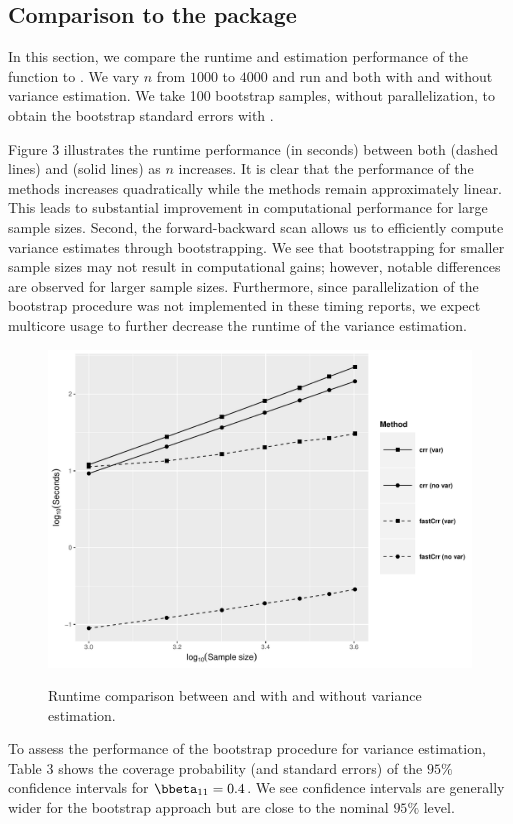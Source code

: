 \subsection[Comparison to the crr package]{Comparison to the  package}
\label{s3:crr}
In this section, we compare the runtime and estimation performance of the  function to . We vary $n$ from $1000$ to $4000$ and run  and  both with and without variance estimation. We take 100 bootstrap samples, {\color{blue}without parallelization}, to obtain the bootstrap standard errors with . 

Figure 3 illustrates the runtime performance (in seconds) between both  (dashed lines) and  (solid lines) as $n$ increases. It is clear that the performance of the  methods increases quadratically while the  methods remain approximately linear. This leads to substantial improvement in computational performance for large sample sizes. Second, the forward-backward scan allows us to efficiently compute variance estimates through bootstrapping. We see that bootstrapping for smaller sample sizes may not result in computational gains; however, notable differences are observed for larger sample sizes. {\color{blue} Furthermore, since parallelization of the bootstrap procedure was not implemented in these timing reports, we expect multicore usage to further decrease the runtime of the variance estimation}. 

\begin{figure}[t!]
\centering
\includegraphics[scale = 0.6]{plots/log_NOPEN-eps-converted-to.pdf}
\label{fig3:timing}
\caption{Runtime comparison between  and  with and without variance estimation.}
\end{figure}
To assess the performance of the bootstrap procedure for variance estimation, Table 3 shows the coverage probability (and standard errors) of the $95\%$ confidence intervals for $\bbeta_{11} = 0.4$.  We see  confidence intervals are generally wider for the bootstrap approach but are close to the nominal $95\%$ level.


